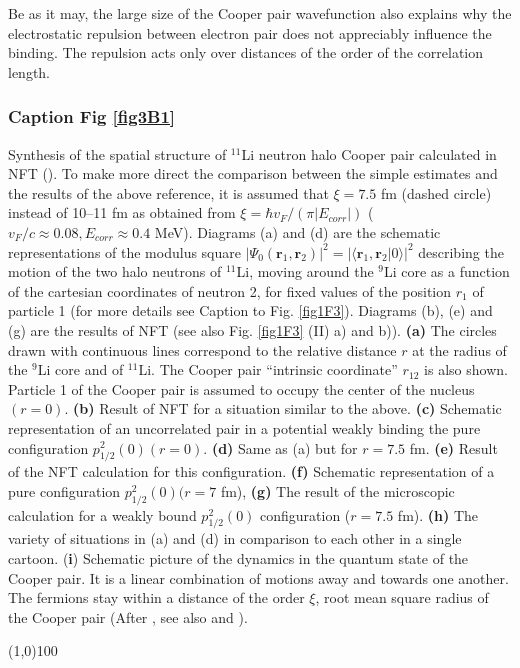 \begin{subappendices}
         
Be as it may, the large size of the Cooper pair wavefunction also explains why the electrostatic repulsion between electron pair does not appreciably influence the binding. The repulsion acts only over distances of the order of the correlation length. 

         \subsubsection{Caption Fig \ref{fig3B1}}
         Synthesis of the spatial structure of $^{11}$Li neutron halo Cooper pair calculated in NFT (\cite{Barranco:01}). To make more direct the comparison between the simple estimates and the results of the above reference, it is assumed that $\xi=7.5$ fm (dashed circle) instead of 10--11 fm as obtained from $\xi=\hbar v_F/(\pi |E_{corr}|)$ ($v_F/c\approx 0.08, E_{corr}\approx 0.4$ MeV). Diagrams (a) and (d) are the schematic representations of the modulus square $|\Psi_0(\mathbf r_1, \mathbf r_2)|^2=|\langle\mathbf r_1, \mathbf r_2|0\rangle|^2$ describing the motion of the two halo neutrons of $^{11}$Li, moving around the $^{9}$Li core as a function of the cartesian coordinates of neutron 2, for fixed values of the position $r_1$ of particle 1 (for more details see Caption to Fig. \ref{fig1F3}). Diagrams (b), (e) and (g) are the results of NFT (see also Fig. \ref{fig1F3} (II) a) and b)). \textbf{(a)} The  circles drawn with continuous lines correspond to the relative distance $r$ at the radius of the $^{9}$Li core and of $^{11}$Li. The Cooper pair ``intrinsic coordinate'' $r_{12}$ is also shown. Particle 1 of the Cooper pair is assumed to occupy the center of the nucleus $(r=0)$. \textbf{(b)} Result of NFT for a situation similar to the above. \textbf{(c)} Schematic representation of an uncorrelated pair in a potential weakly binding the pure configuration $p^2_{1/2}(0) (r=0)$. \textbf{(d)} Same as (a) but for $r=7.5$ fm. \textbf{(e)} Result of the NFT calculation for this configuration. \textbf{(f)} Schematic representation of a pure configuration $p^2_{1/2}(0) (r=7$ fm), \textbf{(g)} The result of the microscopic calculation for a weakly bound $p^2_{1/2}(0)$ configuration ($r=7.5$ fm). \textbf{(h)} The variety of situations in (a) and (d) in comparison to each other in a single cartoon. (\textbf{i}) Schematic picture of the dynamics in the quantum state of the Cooper pair. It is a linear combination of motions away and towards one another. The fermions stay within a distance of the order $\xi$, root mean square radius of the Cooper pair (After \cite{Weisskopf:81}, see also \cite{Kadin:07} and \cite{VanWitsen:14}).
\begin{center}
	\line(1,0){100}
\end{center}
         

\end{subappendices}
